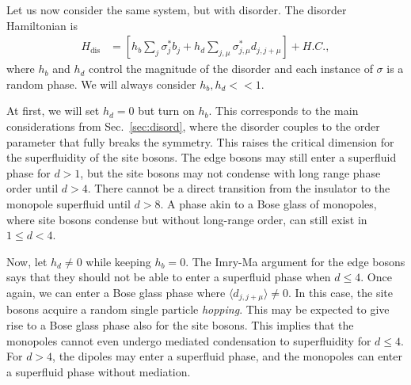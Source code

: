 \documentclass[pra,aps,twocolumn, amsfonts,amsmath,amssymb,nofootinbib,superscriptaddress]{revtex4}
\newcommand{\todo}[1]{\textcolor{orange}{#1}}
\begin{document}


Let us now consider the same system, but with disorder.  The disorder Hamiltonian is
\begin{align}
H_\text{dis} &= \left[h_b\sum_j \sigma^*_jb_j + h_d \sum_{j,\mu} \sigma^*_{j,\mu}d_{j,j+\mu}\right] + H.C.,
\end{align}
where $h_b$ and $h_d$ control the magnitude of the disorder and each instance of $\sigma$ is a random phase. We will always consider $h_b,h_d<<1$.

At first, we will set $h_d=0$ but turn on $h_b$. This corresponds to the main considerations from Sec.~\ref{sec:disord}, where the disorder couples to the order parameter that fully breaks the symmetry. This raises the critical dimension for the superfluidity of the site bosons. The edge bosons may still enter a superfluid phase for $d>1$, but the site bosons may not condense with long range phase order until $d>4$. There cannot be a direct transition from the insulator to the monopole superfluid until $d>8$.  A phase akin to a Bose glass \cite{Fisheretal} of monopoles, where site bosons condense but without long-range order, can still exist in $1\le d<4$. 

Now, let $h_d\ne 0$ while keeping $h_b=0$. The Imry-Ma argument for the edge bosons says that they should not be able to enter a superfluid phase when $d\le 4$. Once again, we can enter a Bose glass phase where $\langle d_{j, j+\mu} \rangle \ne 0$. In this case, the site bosons acquire a random single particle {\it hopping}. This may be expected to give rise to a Bose glass phase also for the site bosons. This implies that the monopoles cannot even undergo mediated condensation to superfluidity for $d\le 4$. For $d>4$, the dipoles may enter a superfluid phase, and the monopoles can enter a superfluid phase without mediation.
\end{document}
